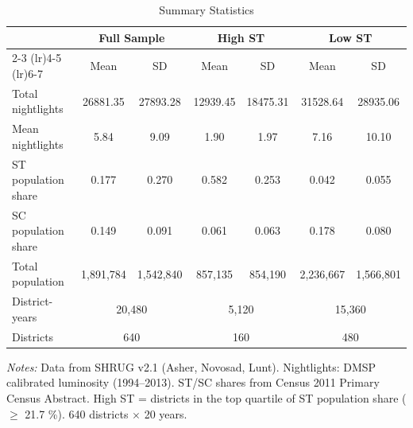 \begin{table}[htbp]
\centering
\caption{Summary Statistics}\label{tab:summary}
\small
\begin{threeparttable}
\begin{tabular}{lcccccc}
\toprule
 & \multicolumn{2}{c}{Full Sample} & \multicolumn{2}{c}{High ST} & \multicolumn{2}{c}{Low ST} \\
\cmidrule(lr){2-3} \cmidrule(lr){4-5} \cmidrule(lr){6-7}
 & Mean & SD & Mean & SD & Mean & SD \\
\midrule
Total nightlights & 26881.35 & 27893.28 & 12939.45 & 18475.31 & 31528.64 & 28935.06 \\ 
Mean nightlights & 5.84 & 9.09 & 1.90 & 1.97 & 7.16 & 10.10 \\ 
ST population share & 0.177 & 0.270 & 0.582 & 0.253 & 0.042 & 0.055 \\
SC population share & 0.149 & 0.091 & 0.061 & 0.063 & 0.178 & 0.080 \\
Total population & 1,891,784 & 1,542,840 & 857,135 & 854,190 & 2,236,667 & 1,566,801 \\
\midrule
District-years & \multicolumn{2}{c}{20,480} & \multicolumn{2}{c}{5,120} & \multicolumn{2}{c}{15,360} \\
Districts & \multicolumn{2}{c}{640} & \multicolumn{2}{c}{160} & \multicolumn{2}{c}{480} \\
\bottomrule
\end{tabular}
\begin{tablenotes}\small
\item \textit{Notes:} Data from SHRUG v2.1 (Asher, Novosad, Lunt). Nightlights: DMSP calibrated luminosity (1994--2013). ST/SC shares from Census 2011 Primary Census Abstract. High ST = districts in the top quartile of ST population share ($\geq$ 21.7 \%). 640 districts $\times$ 20 years.
\end{tablenotes}
\end{threeparttable}
\end{table}
